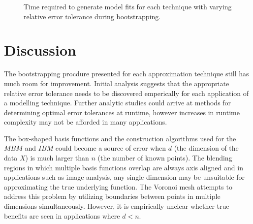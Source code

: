 \begin{figure}
  \caption{Time required to generate model fits for each technique with varying relative error tolerance during bootstrapping.
    \vspace{-.3cm}}
  \label{fig_eval_times}
\end{figure}

\section{Discussion}

The bootstrapping procdure presented for each approximation technique still has much room for improvement. Initial analysis suggests that the appropriate relative error tolerance needs to be discovered emperically for each application of a modelling technique. Further analytic studies could arrive at methods for determining optimal error tolerances at runtime, however increases in runtime complexity may not be afforded in many applications. 

The box-shaped basis functions and the construction algorithms used for the $MBM$ and $IBM$ could become a source of error when $d$ (the dimension of the data $X$) is much larger than $n$ (the number of known points). The blending regions in which multiple basis functions overlap are always axis aligned and in applications such as image analysis, any single dimension may be unsuitable for approximating the true underlying function. The Voronoi mesh attempts to address this problem by utilizing boundaries between points in multiple dimensions simultaneously. However, it is empirically unclear whether true benefits are seen in applications where $d < n$.

